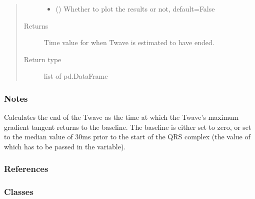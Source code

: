 \documentclass[letterpaper,10pt,english]{sphinxmanual}
\begin{document}
\begin{fulllineitems}
\begin{quote}
\begin{description}
\begin{itemize}
\item {} 
\sphinxAtStartPar
{} (\sphinxstyleliteralemphasis{\sphinxupquote{, }}) \textendash{} Whether to plot the results or not, default=False

\end{itemize}

\item[{Returns}] \leavevmode
\sphinxAtStartPar
{} \textendash{} Time value for when T\sphinxhyphen{}wave is estimated to have ended.

\item[{Return type}] \leavevmode
\sphinxAtStartPar
list of pd.DataFrame

\end{description}\end{quote}
\subsubsection*{Notes}

\sphinxAtStartPar
Calculates the end of the T\sphinxhyphen{}wave as the time at which the T\sphinxhyphen{}wave’s maximum gradient tangent returns to the
baseline. The baseline is either set to zero, or set to the median value of 30ms prior to the start of the QRS
complex (the value of which has to be passed in the  variable).
\subsubsection*{References}

\end{fulllineitems}

\subsubsection*{Classes}
\end{document}
